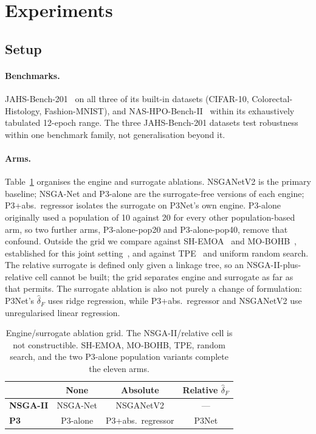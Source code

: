 \section{Experiments}
\label{sec:results}

\subsection{Setup}

\paragraph{Benchmarks.} JAHS-Bench-201~\citep{bansal2022jahsbench} on all three of its built-in datasets
(CIFAR-10, Colorectal-Histology, Fashion-MNIST), and NAS-HPO-Bench-II~\citep{hirose2021nashpobenchii} within its
exhaustively tabulated 12-epoch range. The three JAHS-Bench-201 datasets test robustness within one benchmark
family, not generalisation beyond it.

\paragraph{Arms.} Table~\ref{tab:ablation-grid} organises the engine and surrogate ablations. NSGANetV2 is the
primary baseline; NSGA-Net and P3-alone are the surrogate-free versions of each engine; P3+abs.\ regressor
isolates the surrogate on P3Net's own engine. P3-alone originally used a population of 10 against 20 for every
other population-based arm, so two further arms, P3-alone-pop20 and P3-alone-pop40, remove that confound. Outside
the grid we compare against SH-EMOA~\citep{beume2007smsemoa} and MO-BOHB~\citep{falkner2018bohb}, established for
this joint setting~\citep{guerreroviu2021bagofbaselines}, and against TPE~\citep{bergstra2011tpe} and uniform
random search. The relative surrogate is defined only given a linkage tree, so an NSGA-II-plus-relative cell
cannot be built; the grid separates engine and surrogate as far as that permits. The surrogate ablation is
also not purely a change of formulation: P3Net's $\hat\delta_F$ uses ridge regression, while P3+abs.\ regressor
and NSGANetV2 use unregularised linear regression.

\begin{table}[t]
    \centering
    \caption{Engine/surrogate ablation grid. The NSGA-II/relative cell is not constructible. SH-EMOA, MO-BOHB,
    TPE, random search, and the two P3-alone population variants complete the eleven arms.}
    \label{tab:ablation-grid}
    \begin{tabular}{@{}lccc@{}}
        \toprule
         & \textbf{None} & \textbf{Absolute} & \textbf{Relative} $\hat{\delta}_F$ \\
        \midrule
        \textbf{NSGA-II} & NSGA-Net & NSGANetV2 & --- \\
        \textbf{P3}      & P3-alone & P3+abs.\ regressor & P3Net \\
        \bottomrule
    \end{tabular}
\end{table}

